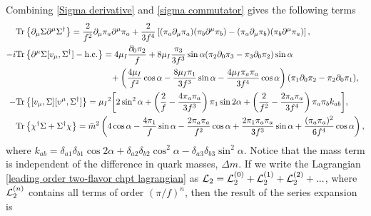 %
Combining \autoref{Sigma derivative} and \autoref{sigma commutator} gives the following terms
\begin{align}
    & \text{Tr} \left\{ \partial_\mu \Sigma \partial^\mu \Sigma^\dagger \right\}
    = \frac{2}{f^2} \partial_\mu \pi_a \partial^\mu \pi_a
    + \frac{2}{3f^4}
    \left[
        (\pi_a\partial_\mu \pi_a)(\pi_b\partial^\mu \pi_b)
        -        
        (\pi_a\partial_\mu \pi_b)(\pi_b\partial^\mu \pi_a)
    \right], \\
    \nonumber
    -i  &\text{Tr} \left\{ \partial^\mu\Sigma[v_\mu,\Sigma^\dagger] - \text{h.c.} \right\}
    =
    4 \mu_I \frac{\partial_0\pi_2}{f}
    + 8 \mu_I \frac{\pi_3}{3f^3}\sin{\alpha}(
        \pi_2 \partial_0 \pi_3 - \pi_3 \partial_0 \pi_2
        ) \sin{\alpha}
    \\ & \quad \quad \quad \quad \quad \quad \quad \quad \quad \quad \quad
    +
    \left(
        \frac{4\mu_I}{f^2} \cos{\alpha}
        - \frac{8 \mu_I\pi_1}{3f^3} \sin{\alpha}
        - \frac{4 \mu_I \pi_a \pi_a} {3f^4}\cos{\alpha} 
    \right) 
    (\pi_1\partial_0 \pi_2 - \pi_2 \partial_0 \pi_1), \\
    - & \text{Tr} \left\{ [v_\mu,\Sigma][v^\mu,\Sigma^\dagger] \right\}
    = \mu_I{}^2
    \bigg[
        2 \sin^2{\alpha}
        +
        \left(
            \frac{2}{f} 
            - \frac{4\pi_a \pi_a}{3 f^3} 
        \right)
        \pi_1  \sin{2\alpha}
        + \left(
            \frac{2}{f^2}
            - \frac{2 \pi_a \pi_a}{3 f^4} 
        \right)
        \pi_a \pi_b k_{ab}
    \bigg], 
    \\
    & \text{Tr} \left\{ \chi^\dagger \Sigma + \Sigma^\dagger\chi \right\}
    = 
    \bar m^2 
    \left(
        4 \cos{\alpha} 
        - \frac{4 \pi_1}{f} \sin{\alpha} 
        - \frac{2 \pi_a \pi_a}{f^2} \cos{\alpha}
        + \frac{2 \pi_1 \pi_a \pi_a}{3 f^3} \sin{\alpha}
        + \frac{(\pi_a \pi_a)^2}{6 f^4}\cos{\alpha}
    \right), 
    \end{align}
where $k_{ab} =\delta_{a1} \delta_{b1} \cos{2\alpha}  + \delta_{a2}\delta_{b2}\cos^2{\alpha} - \delta_{a3}\delta_{b3} \sin^2{\alpha}$.
Notice that the mass term is independent of the difference in quark masses, $\Delta m$.
If we write the Lagrangian \autoref{leading order two-flavor chpt lagrangian} as $\mathcal{L}_2 = \mathcal{L}_2^{(0)} + \mathcal{L}_2^{(1)} + \mathcal{L}_2^{(2)} +...$, where $\mathcal{L}_2^{(n)}$ contains all terms of order $(\pi/f)^n$, then the result of the series expansion is
